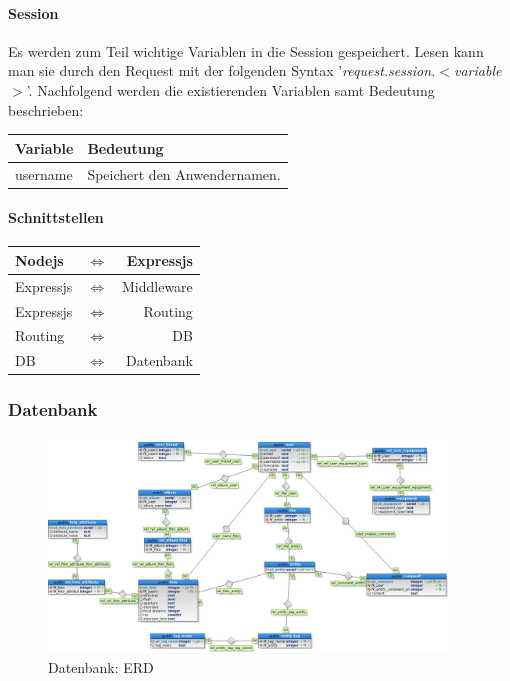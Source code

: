 \documentclass[a4paper,bibtotoc,oneside]{scrartcl}	%
\begin{document}
			\paragraph{Session}
			Es werden zum Teil wichtige Variablen in die Session gespeichert. Lesen kann man sie durch den Request mit der folgenden Syntax '\textit{request.session.$<$variable$>$}'. Nachfolgend werden die existierenden Variablen samt Bedeutung beschrieben:
			
			\begin{center}
			\begin{tabular}{|l|l|}
			\hline
			\bf Variable & \bf Bedeutung \\
			\hline
			username & Speichert den Anwendernamen. \\
			\hline
			\end{tabular}
			\end{center}
			
			\paragraph{Schnittstellen}
			\begin{center}
			\begin{tabular}{|lcr|}
			\hline
			Nodejs & $\Leftrightarrow$ & Expressjs \\
			\hline
			Expressjs & $\Leftrightarrow$ & Middleware \\
			\hline
			Expressjs & $\Leftrightarrow$ & Routing \\
			\hline
			Routing & $\Leftrightarrow$ & DB \\
			\hline
			DB & $\Leftrightarrow$ & Datenbank \\
			\hline
			\end{tabular}
			\end{center}
			
		\subsubsection{Datenbank}

			\begin{figure}[H]
			\centering
			\includegraphics[width=400px]{Mockups/db_v1.png}
			\caption{Datenbank: ERD}
			\end{figure}
\end{document}
